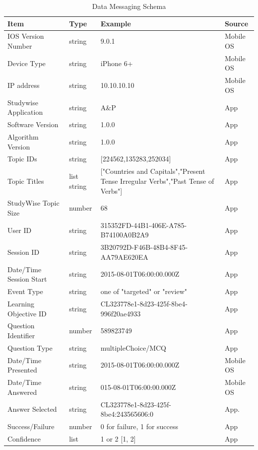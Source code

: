 \documentclass[runningheads,a4paper]{llncs}
\begin{document}
\begin{table}[h]
\small
\caption{Data Messaging Schema}
\begin{center}
\begin{tabular}{ | l | l | p{7cm} | l | }
\hline
Item & Type & Example & Source \\
\hline
IOS Version Number & string & 9.0.1 &  Mobile OS \\
\hline
Device Type & string & iPhone 6+ &  Mobile OS \\
\hline
IP address & string & 10.10.10.10 & Mobile OS \\
\hline
Studywise Application & string & A\&P & App \\
\hline
Software Version	 & string & 1.0.0 &  App \\
\hline
Algorithm Version & string & 1.0.0 & App \\
\hline
Topic IDs & string & [224562,135283,252034] & App  \\
\hline
Topic Titles & list string & ["Countries and Capitals","Present Tense Irregular Verbs","Past Tense of Verbs"] &  App   \\
\hline
StudyWise Topic Size & number & 68 &  App  \\
\hline
User ID & string & 315352FD-44B1-406E-A785-B74100A0B2A9 &  App \\
\hline
Session ID & string & 3B20792D-F46B-48B4-8F45-AA79AE620EA	 &  App  \\
\hline
Date/Time Session Start & string & 2015-08-01T06:00:00.000Z &  App \\
\hline
Event Type & string & one of "targeted" or "review" &  App \\
\hline
Learning Objective ID & string & CL323778e1-8d23-425f-8be4-996f20ae4933 &  App \\
\hline
Question Identifier & number & 589823749 &  App  \\
\hline
Question Type & string & multipleChoice/MCQ &  App   \\
\hline
Date/Time Presented & string & 2015-08-01T06:00:00.000Z & Mobile OS \\
\hline
Date/Time Answered	 & string & 015-08-01T06:00:00.000Z &  Mobile OS \\
\hline
Answer Selected & string & CL323778e1-8d23-425f-8be4:243565606:0 &  App. \\
\hline
Success/Failure & number & 0 for failure, 1 for success &  App \\
\hline
Confidence & list & 1 or 2 [1, 2] & App \\
\hline

\end{tabular}
\end{center}
\end{table}
\end{document}
